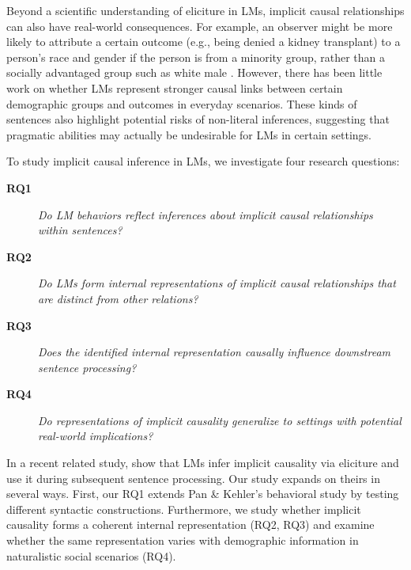 \documentclass[11pt]{article}
\begin{document}
Beyond a scientific understanding of eliciture in LMs, implicit causal relationships can also have real-world consequences. For example, an observer might be more likely to attribute a certain outcome (e.g., being denied a kidney transplant) to a person's race and gender if the person is from a minority group, rather than a socially advantaged group such as white male \citep{grier-mcgill-2000,hegarty-pratto-2001}. However, there has been little work on whether LMs represent stronger causal links between certain demographic groups and outcomes in everyday scenarios. These kinds of sentences also highlight potential risks of non-literal inferences, suggesting that pragmatic abilities may actually be undesirable for LMs in certain settings.

To study implicit causal inference in LMs, we investigate four research questions:
\begin{description}
  \item[\textbf{RQ1}] \textit{Do LM behaviors reflect inferences about implicit causal relationships within sentences?}
  \item[\textbf{RQ2}] \textit{Do LMs form internal representations of implicit causal relationships that are distinct from other relations?}
  \item[\textbf{RQ3}] \textit{Does the identified internal representation causally influence downstream sentence processing?}
  \item[\textbf{RQ4}] \textit{Do representations of implicit causality generalize to settings with potential real-world implications?}
\end{description}

In a recent related study, \citet{pan-kehler-2025-pragmatic} show that LMs infer implicit causality via eliciture and use it during subsequent sentence processing. Our study expands on theirs in several ways. First, our RQ1 extends Pan \& Kehler's behavioral study by testing different syntactic constructions. Furthermore, we study whether implicit causality forms a coherent internal representation (RQ2, RQ3) and examine whether the same representation varies with demographic information in naturalistic social scenarios (RQ4).
\end{document}
